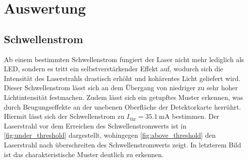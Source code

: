 \chapter{Auswertung}
\label{cha:Auswertung}

\section{Schwellenstrom}

Ab einem bestimmten Schwellenstrom fungiert der Laser nicht mehr lediglich als LED, sondern es tritt ein selbstverstärkender
Effekt auf, wodurch sich die Intensität des Laserstrahls drastisch erhöht und kohärentes Licht geliefert wird. Dieser Schwellenstrom lässt sich an dem Übergang von niedriger zu sehr hoher Lichtintensität festmachen.
Zudem lässt sich ein getupftes Muster erkennen, was durch Beugungseffekte an der unebenen Oberfläche der Detektorkarte herrührt.\\
Hiermit lässt sich der Schwellenstrom zu $I_{\mathrm{thr}} = \qty{35.1}{\milli\ampere}$ bestimmen. Der Laserstrahl vor dem Erreichen des Schwellenstromwerts ist in 
\autoref{fig:under_threshold} dargestellt, wohingegen \autoref{fig:above_threshold} den Laserstrahl nach überschreiten des Schwellenstromwerts zeigt. In letzterem Bild 
ist das charakteristische Muster deutlich zu erkennen.
